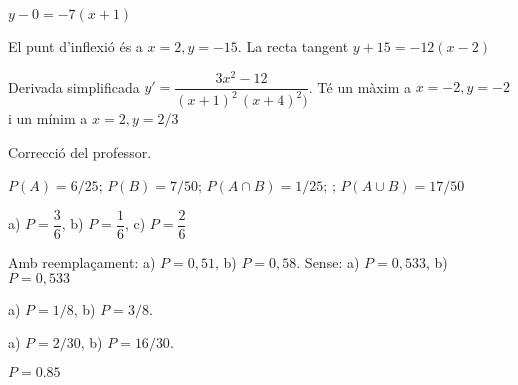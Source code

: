 \documentclass[11pt, a4paper, pdf]{article}
\let\frac\dfrac
\begin{document}
\begin{multicols}{2}
\begin{mylist}
\item $y-0=-7(x+1)$

\item El punt d'inflexió és a $x=2, y=-15$. La recta tangent $y+15=-12(x-2)$

\item Derivada simplificada $y'=\frac{3x^2-12}{(x+1)^2 \,(x+4)^2)}$. Té un màxim a $x=-2, y=-2$ i un mínim a $x=2, y=2/3$

\item Correcció del professor.

\item $P(A)=6/25$; $P(B)=7/50$; $P(A\cap B)=1/25$; ; $P(A\cup B)=17/50$   

\item a) $P=\frac{3}{6}$, b) $P=\frac{1}{6}$,  c) $P=\frac{2}{6}$

\item Amb reemplaçament: a) $P=0,51$, b) $P=0,58$. Sense: a) $P=0,533$, b) $P=0,533$

\item a) $P=1/8$, b) $P=3/8$.

\item a) $P=2/30$, b) $P=16/30$.

\item $P=0.85$
\end{mylist}

\end{multicols}
\end{document}
